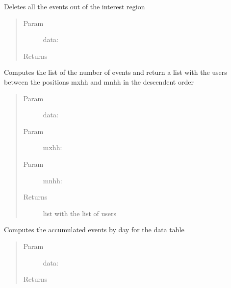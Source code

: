 \documentclass[letterpaper,10pt,english]{sphinxmanual}
\begin{document}
\begin{fulllineitems}
\label{index:SuperHubData.cleanDataArea}
Deletes all the events out of the interest region
\begin{quote}\begin{description}
\item[{Param }] \leavevmode
data:

\item[{Returns}] \leavevmode


\end{description}\end{quote}

\end{fulllineitems}


\begin{fulllineitems}
\label{index:SuperHubData.computeHeavyHitters}
Computes the list of the number of events
and return a list with the users between the
positions mxhh and mnhh in the descendent order
\begin{quote}\begin{description}
\item[{Param }] \leavevmode
data:

\item[{Param }] \leavevmode
mxhh:

\item[{Param }] \leavevmode
mnhh:

\item[{Returns}] \leavevmode
list with the list of users

\end{description}\end{quote}

\end{fulllineitems}


\begin{fulllineitems}
\label{index:SuperHubData.dailyTable}
Computes the accumulated events by day for the data table
\begin{quote}\begin{description}
\item[{Param }] \leavevmode
data:

\item[{Returns}] \leavevmode


\end{description}\end{quote}

\end{fulllineitems}
\end{document}
